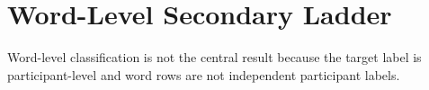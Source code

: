 \section{Word-Level Secondary Ladder}
Word-level classification is not the central result because the target label is participant-level and word rows are not independent participant labels.

